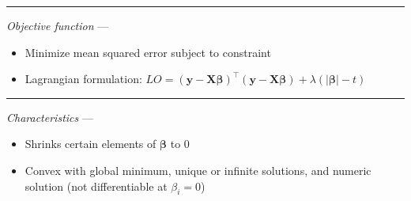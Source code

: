 {\color{lightgray}\hrule height 0.001mm}

\emph{Objective function} --- 
\begin{itemize}
    \item Minimize mean squared error subject to constraint
    \item Lagrangian formulation: $LO = ( \boldsymbol{y} - \boldsymbol{X}\boldsymbol{\beta})^\intercal( \boldsymbol{y} - \boldsymbol{X}\boldsymbol{\beta} ) + \lambda ( |\boldsymbol{\beta}| - t )$
\end{itemize}

{\color{lightgray}\hrule height 0.001mm}

\emph{Characteristics} ---
\begin{itemize}
    \item Shrinks certain elements of $\boldsymbol{\beta}$ to 0
    \item Convex with global minimum, unique or infinite solutions, and numeric solution (not differentiable at $\beta_i = 0$)
\end{itemize}